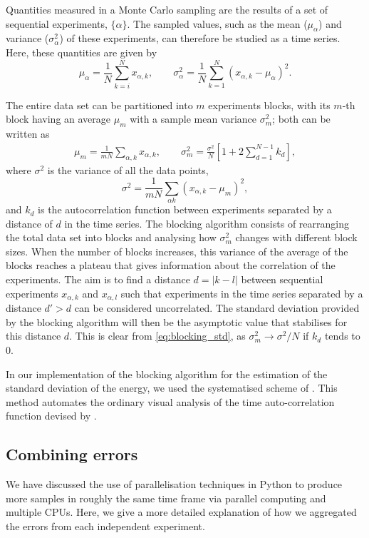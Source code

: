 Quantities measured in a Monte Carlo sampling are the results of a set of sequential experiments, $\{\alpha\}$. The sampled values, such as the mean ($\mu_\alpha$) and variance ($\sigma_\alpha^2$) of these experiments, can therefore be studied as a time series. Here, these quantities are given by
\begin{equation}
    \mu_{\alpha}=\frac{1}{N}\sum_{k=i}^N x_{\alpha, k}, \qquad \sigma^2_\alpha=\frac{1}{N}\sum_{k=1}^N(x_{\alpha, k} -\mu_\alpha)^2.
\end{equation}

The entire data set can be partitioned into $m$ experiments blocks, with its $m$-th block having an average $\mu_{m}$ with a sample mean variance $\sigma^2_m$; both can be written as
\begin{align}
    \mu_{m}=\frac{1}{mN}\sum_{\alpha, k} x_{\alpha, k}, \qquad  
    \sigma^2_m= \frac{\sigma^2}{N}[1 + 2\sum_{d=1}^{N-1}k_d],
    \label{eq:blocking_std}
\end{align}
where $\sigma^2$ is the variance of all the data points,
\begin{equation*}
    \sigma^2 =\frac{1}{mN}\sum_{\alpha k}(x_{\alpha, k} -\mu_m)^2,
\end{equation*}
and $k_d$ is the autocorrelation function \cite{park2018fundamentals} between experiments separated by a distance of $d$ in the time series. The blocking algorithm consists of rearranging the total data set into blocks and analysing how $\sigma_m^2$ changes with different block sizes. When the number of blocks increases, this variance of the average of the blocks reaches a plateau that gives information about the correlation of the experiments. The aim is to find a distance $d = |k-l|$ between sequential experiments $x_{\alpha, k}$ and $x_{\alpha, l}$ such that experiments in the time series separated by a distance $d' > d$ can be considered uncorrelated. The standard deviation provided by the blocking algorithm will then be the asymptotic value that stabilises for this distance $d$. This is clear from \eqref{eq:blocking_std}, as $\sigma^2_m \to \sigma^2/N$ if $k_d$ tends to 0.

In our implementation of the blocking algorithm for the estimation of the standard deviation of the energy, we used the systematised scheme of \cite{jonssonStandardErrorEstimation2018}. This method automates the ordinary visual analysis of the time auto-correlation function devised by \cite{flyvbjergErrorEstimatesAverages1989}. 

\subsection{Combining errors}
We have discussed the use of parallelisation techniques in Python to produce more samples in roughly the same time frame via parallel computing and multiple CPUs. Here, we give a more detailed explanation of how we aggregated the errors from each independent experiment.

